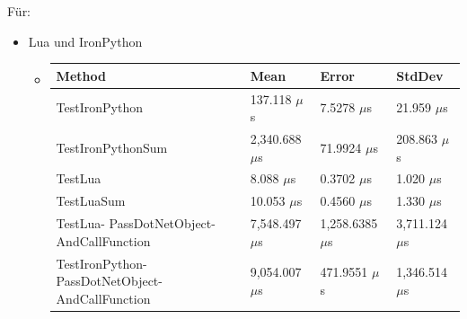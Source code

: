 Für:
\begin{itemize}
    \item Lua und IronPython
    \begin{itemize}
        \item \begin{table}[H]
            \begin{tabular}{|p{3.5cm}|p{3cm}|p{3cm}|p{3cm}|}
            \hline
                Method &   Mean &   Error & StdDev \\ \hline
                TestIronPython & 137.118 $\mu$s & 7.5278 $\mu$s & 21.959 $\mu$s \\ \hline
                TestIronPythonSum & 2,340.688 $\mu$s & 71.9924 $\mu$s & 208.863 $\mu$s \\ \hline
                TestLua & 8.088 $\mu$s & 0.3702 $\mu$s & 1.020 $\mu$s \\ \hline
                TestLuaSum & 10.053 $\mu$s & 0.4560 $\mu$s & 1.330 $\mu$s \\ \hline
                TestLua-
                PassDotNetObject- 
                AndCallFunction & 7,548.497 $\mu$s & 1,258.6385 $\mu$s & 3,711.124 $\mu$s \\ \hline
                TestIronPython-
                PassDotNetObject- 
                AndCallFunction & 9,054.007 $\mu$s & 471.9551 $\mu$s & 1,346.514 $\mu$s \\ \hline
            \end{tabular}
        \end{table}
    \end{itemize}


\end{itemize}

